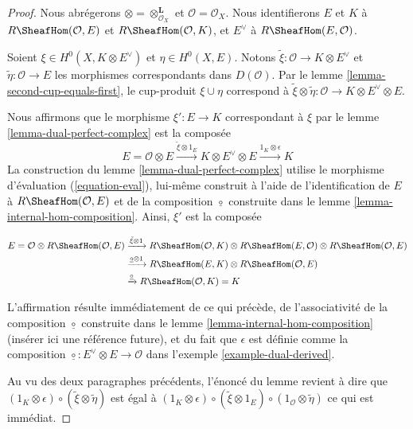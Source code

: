 \begin{proof}
Nous abrégerons $\otimes = \otimes_{\mathcal{O}_X}^\mathbf{L}$ et $\mathcal{O} = \mathcal{O}_X$. Nous identifierons $E$ et $K$ à $R\SheafHom(\mathcal{O}, E)$ et $R\SheafHom(\mathcal{O}, K)$, et $E^\vee$ à $R\SheafHom(E, \mathcal{O})$.

\medskip\noindent
Soient $\xi \in H^0(X, K \otimes E^\vee)$ et $\eta \in H^0(X, E)$. Notons $\tilde \xi : \mathcal{O} \to K \otimes E^\vee$ et $\tilde \eta : \mathcal{O} \to E$ les morphismes correspondants dans $D(\mathcal{O})$. Par le lemme \ref{lemma-second-cup-equals-first}, le cup-produit $\xi \cup \eta$ correspond à $\tilde \xi \otimes \tilde \eta : \mathcal{O} \to
K \otimes E^\vee \otimes E$.

\medskip\noindent

Nous affirmons que le morphisme $\xi' : E \to K$ correspondant à $\xi$ par le lemme \ref{lemma-dual-perfect-complex} est la composée
$$
E = \mathcal{O} \otimes E
\xrightarrow{\tilde \xi \otimes 1_E}
K \otimes E^\vee \otimes E
\xrightarrow{1_K \otimes \epsilon}
K
$$
La construction du lemme \ref{lemma-dual-perfect-complex}
utilise le morphisme d'évaluation (\ref{equation-eval}), lui-même construit à l'aide de l'identification de $E$ à
$R\SheafHom(\mathcal{O}, E)$ et de la composition
$\underline{\circ}$ construite dans le lemme \ref{lemma-internal-hom-composition}. Ainsi, $\xi'$ est la composée

\begin{align*}
E = \mathcal{O} \otimes
R\SheafHom(\mathcal{O}, E)
& \xrightarrow{\tilde \xi \otimes 1}
R\SheafHom(\mathcal{O}, K) \otimes
R\SheafHom(E, \mathcal{O}) \otimes
R\SheafHom(\mathcal{O}, E) \\
& \xrightarrow{\underline{\circ} \otimes 1}
R\SheafHom(E, K) \otimes R\SheafHom(\mathcal{O}, E) \\
& \xrightarrow{\underline{\circ}}
R\SheafHom(\mathcal{O}, K) = K
\end{align*}

L'affirmation résulte immédiatement de ce qui précède, de l'associativité de la composition $\underline{\circ}$ construite dans le lemme \ref{lemma-internal-hom-composition} (insérer ici une référence future), et du fait que $\epsilon$
est définie comme la composition
$\underline{\circ} : E^\vee \otimes E \to \mathcal{O}$ dans l'exemple \ref{example-dual-derived}.

\medskip\noindent

Au vu des deux paragraphes précédents, l'énoncé du lemme revient à dire que
$(1_K \otimes \epsilon) \circ (\tilde \xi \otimes \tilde \eta)$
est égal à
$(1_K \otimes \epsilon) \circ (\tilde \xi \otimes 1_E)
\circ (1_\mathcal{O} \otimes \tilde \eta)$
ce qui est immédiat.

\end{proof}

